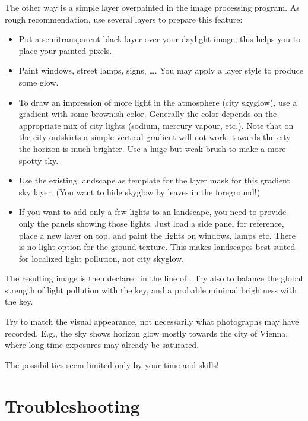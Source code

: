 The other way is a simple layer overpainted in the image processing
program. As rough recommendation, use several layers to prepare this
feature:
\begin{itemize}
\item Put a semitransparent black layer over your daylight image, this
  helps you to place your painted pixels.
\item Paint windows, street lamps, signs, \ldots. You may apply a
  layer style to produce some glow.
\item To draw an impression of more light in the atmosphere (city
  skyglow), use a gradient with some brownish color. Generally the
  color depends on the appropriate mix of city lights (sodium, mercury
  vapour, etc.). Note that on the city outskirts a simple vertical
  gradient will not work, towards the city the horizon is much
  brighter. Use a huge but weak brush to make a more spotty sky.
\item Use the existing landscape as template for the layer mask for
  this gradient sky layer. (You want to hide skyglow by leaves in the
  foreground!)
\item If you want to add only a few lights to an 
  landscape, you need to provide only the panels showing those
  lights. Just load a side panel for reference, place a new layer on
  top, and paint the lights on windows, lamps etc. There is no light
  option for the ground texture. This makes 
  landscapes best suited for localized light pollution, not city
  skyglow.
\end{itemize}

The resulting image is then declared in the  line
of . Try also to balance the global strength of
light pollution with the  key, and a probable
minimal brightness with the  key.

Try to match the visual appearance, not necessarily what photographs
may have recorded. E.g., the  sky shows horizon
glow mostly towards the city of Vienna, where long-time exposures may
already be saturated.

The possibilities seem limited only by your time and skills!

\section{Troubleshooting}
\label{sec:landscapes:Troubleshooting}

